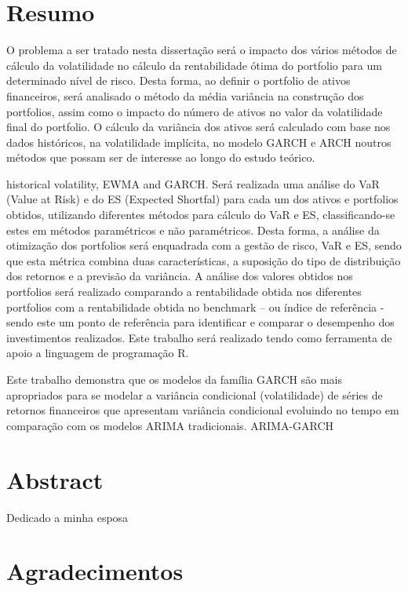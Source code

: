\clearpage

\chapter*{Resumo}
\fontsize{12}{21}\selectfont
O problema a ser tratado nesta dissertação será o impacto dos vários métodos de cálculo da volatilidade no cálculo da rentabilidade ótima do portfolio para um determinado nível de risco.
Desta forma, ao definir o portfolio de ativos financeiros, será analisado o método da média variância na construção dos portfolios, assim como o impacto do número de ativos no valor da volatilidade final do portfolio. O cálculo da variância dos ativos será calculado com base nos dados históricos, na volatilidade implícita, no modelo GARCH e ARCH noutros métodos que possam ser de interesse ao longo do estudo teórico.

historical volatility, EWMA and GARCH.
Será realizada uma análise do VaR (Value at Risk) e do ES (Expected Shortfal) para cada um dos ativos e portfolios obtidos, utilizando diferentes métodos para cálculo do VaR e ES, classificando-se estes em métodos paramétricos e não paramétricos. Desta forma, a análise da otimização dos portfolios será enquadrada com a gestão de risco, VaR e ES, sendo que esta métrica combina duas características, a suposição do tipo de distribuição dos retornos e a previsão da variância.
A análise dos valores obtidos nos portfolios será realizado comparando a rentabilidade obtida nos diferentes portfolios com a rentabilidade obtida no benchmark – ou índice de referência - sendo este um ponto de referência para identificar e comparar o desempenho dos investimentos realizados.
Este trabalho será realizado tendo como ferramenta de apoio a linguagem de programação R.

Este trabalho demonstra que os modelos da família GARCH são mais apropriados para se modelar a variância condicional (volatilidade) de séries de retornos financeiros que apresentam variância condicional evoluindo no tempo em comparação com os modelos ARIMA tradicionais.  ARIMA-GARCH



\chapter*{Abstract}

\newenvironment{dedication}
  {\clearpage           %
   \itshape             %
   \raggedleft          %
  }
  {\par %
   \vspace{\stretch{3}} %
   \clearpage           %
  }
\begin{dedication}
{\Large Dedicado a minha esposa\par}
\end{dedication}

\chapter*{Agradecimentos}

